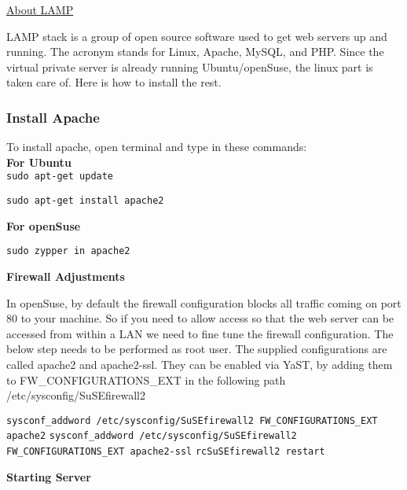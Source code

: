 \documentclass[16pt]{article}
\begin{document}
\vspace{0.5cm}

{\underline{\Large{About LAMP}}}

  LAMP stack is a group of open source software used to get web servers up
  and running. The acronym stands for Linux, Apache, MySQL, and PHP. Since
  the virtual private server is already running Ubuntu/openSuse, the linux
  part is taken care of. Here is how to install the rest.


  
  

  

  \subsubsection{Install Apache}
  
  \hfill

  To install apache, open terminal and type in these commands: \\
  \textbf{For Ubuntu} \\
  \texttt{sudo apt-get update} 

  \texttt{sudo apt-get install apache2}

  \textbf{For openSuse}

  \texttt{sudo zypper in apache2}

  \textbf{Firewall Adjustments}

  In openSuse, by default the firewall configuration blocks all traffic
  coming on port 80 to your machine. So if you need to allow access so
  that the web server can be accessed from within a LAN we need to fine
  tune the firewall configuration. The below step needs to be performed as
  root user. The supplied configurations are called apache2 and
  apache2-ssl. They can be enabled via YaST, by adding them to
  FW\_CONFIGURATIONS\_EXT in the following path /etc/sysconfig/SuSEfirewall2
  
  \vspace{0.5cm}

  \texttt{sysconf\_addword /etc/sysconfig/SuSEfirewall2 FW\_CONFIGURATIONS\_EXT apache2}
  \texttt{sysconf\_addword /etc/sysconfig/SuSEfirewall2 FW\_CONFIGURATIONS\_EXT apache2-ssl}
  \texttt{rcSuSEfirewall2 restart}
  
   \vspace{0.5cm}

  \textbf{Starting Server}
\end{document}

